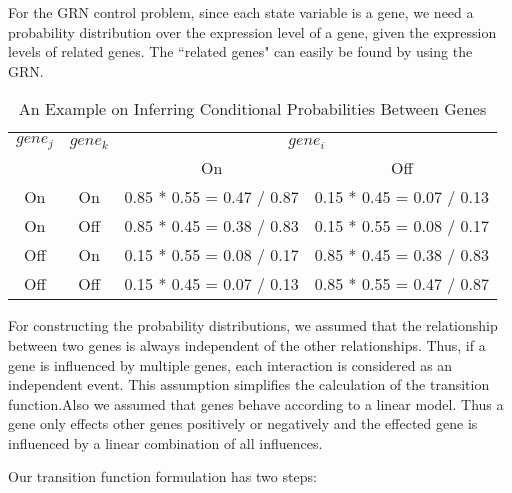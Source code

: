 For the GRN control problem, since each state variable is a gene, we need a probability distribution over the
expression level of a gene, given the expression levels of related genes. The ``related genes" can easily be
found by using the GRN.

{\small
\begin{table}
\begin{center}
\caption{An Example on Inferring Conditional Probabilities Between Genes}\label{geneitable}
\begin{tabular}{|c|c|c|c|}
  \hline

  $gene_j$ & $gene_k$ & \multicolumn{2}{c|}{$gene_i$} \\ \cline{3-4}
    & & On & Off \\
    \hline
  On & On &  0.85 * 0.55 = 0.47 / 0.87 & 0.15 * 0.45 = 0.07 / 0.13 \\
  On & Off & 0.85 * 0.45 = 0.38 / 0.83 & 0.15 * 0.55 = 0.08 / 0.17 \\
  Off & On & 0.15 * 0.55 = 0.08 / 0.17 & 0.85 * 0.45 = 0.38 / 0.83 \\
  Off & Off & 0.15 * 0.45 = 0.07 / 0.13 & 0.85 * 0.55 = 0.47 / 0.87 \\
  \hline
\end{tabular}
\end{center}
\end{table}
}


For constructing the probability distributions, we assumed that the relationship between two genes is
always independent of the other relationships. Thus, if a gene is influenced by multiple genes, each
interaction is considered as an independent event. This assumption simplifies the calculation of the
transition function.Also we assumed that genes behave according to a linear model. Thus a
gene only effects other genes positively or negatively and the effected gene is influenced by
a linear combination of all influences.

Our transition function formulation has two steps:

